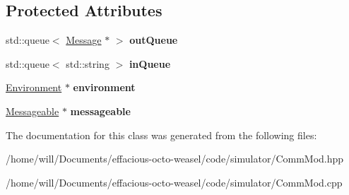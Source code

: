 \subsection*{Protected Attributes}
\begin{DoxyCompactItemize}
\item 
std\+::queue$<$ \hyperlink{class_message}{Message} $\ast$ $>$ {\bfseries out\+Queue}\hypertarget{class_comm_mod_abbd4cbdbb8c4b8680a20aea400e2eabc}{}\label{class_comm_mod_abbd4cbdbb8c4b8680a20aea400e2eabc}

\item 
std\+::queue$<$ std\+::string $>$ {\bfseries in\+Queue}\hypertarget{class_comm_mod_a4d31d6d1741edaaf0ec840ff8bb30047}{}\label{class_comm_mod_a4d31d6d1741edaaf0ec840ff8bb30047}

\item 
\hyperlink{class_environment}{Environment} $\ast$ {\bfseries environment}\hypertarget{class_comm_mod_ae4953d3dd38bca7f71c309964636af91}{}\label{class_comm_mod_ae4953d3dd38bca7f71c309964636af91}

\item 
\hyperlink{class_messageable}{Messageable} $\ast$ {\bfseries messageable}\hypertarget{class_comm_mod_ae45eb57f9d550eb7c0dbb9311a71f72e}{}\label{class_comm_mod_ae45eb57f9d550eb7c0dbb9311a71f72e}

\end{DoxyCompactItemize}


The documentation for this class was generated from the following files\+:\begin{DoxyCompactItemize}
\item 
/home/will/\+Documents/effacious-\/octo-\/weasel/code/simulator/Comm\+Mod.\+hpp\item 
/home/will/\+Documents/effacious-\/octo-\/weasel/code/simulator/Comm\+Mod.\+cpp\end{DoxyCompactItemize}

